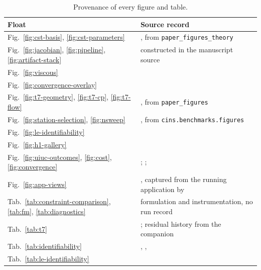 \begin{table}[htbp]
\centering
\caption{Provenance of every figure and table.}
\label{tab:prov}
\footnotesize
\begin{tabularx}{\textwidth}{@{}l L@{}}
\toprule
Float & Source record \\
\midrule
Fig.~\ref{fig:cst-basis}, \ref{fig:cst-parameters} & , from \texttt{paper\_figures\_theory} \\
Fig.~\ref{fig:jacobian}, \ref{fig:pipeline}, \ref{fig:artifact-stack} & constructed in the manuscript source \\
Fig.~\ref{fig:viscous} &  \\
Fig.~\ref{fig:convergence-overlay} &  \\
Fig.~\ref{fig:t7-geometry}, \ref{fig:t7-cp}, \ref{fig:t7-flow} & , from \texttt{paper\_figures} \\
Fig.~\ref{fig:station-selection}, \ref{fig:nsweep} & , from \texttt{cins.benchmarks.figures} \\
Fig.~\ref{fig:le-identifiability} &  \\
Fig.~\ref{fig:h1-gallery} &  \\
Fig.~\ref{fig:uiuc-outcomes}, \ref{fig:cost}, \ref{fig:convergence} & ; ;  \\
Fig.~\ref{fig:app-views} & , captured from the running application by  \\
Tab.~\ref{tab:constraint-comparison}, \ref{tab:fm}, \ref{tab:diagnostics} & formulation and instrumentation, no run record \\
Tab.~\ref{tab:t7} & ; residual history from the companion  \\
Tab.~\ref{tab:identifiability} & , ,  \\
Tab.~\ref{tab:le-identifiability} &  \\

\end{tabularx}
\end{table}
